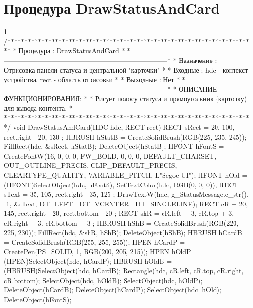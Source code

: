 \section{Процедура DrawStatusAndCard}
\footnotesize
\begin{listing}{1}
/*************************************************************************
* Процедура     : DrawStatusAndCard                                      *
*------------------------------------------------------------------------*
* Назначение    : Отрисовка панели статуса и центральной "карточки"      *
* Входные       : hdc - контекст устройства, rect - область отрисовки    *
* Выходные      : Нет                                                    *
*------------------------------------------------------------------------*
* ОПИСАНИЕ ФУНКЦИОНИРОВАНИЯ:                                             *
* Рисует полосу статуса и прямоугольник (карточку) для вывода контента.   *
*************************************************************************/
void DrawStatusAndCard(HDC hdc, RECT rect) {
    RECT sRect = { 20, 100, rect.right - 20, 130 }; 
    HBRUSH hStatB = CreateSolidBrush(RGB(225, 235, 245)); 
    FillRect(hdc, &sRect, hStatB); DeleteObject(hStatB);
    HFONT hFontS = CreateFontW(16, 0, 0, 0, FW_BOLD, 0, 0, 0, DEFAULT_CHARSET,
		 OUT_OUTLINE_PRECIS, CLIP_DEFAULT_PRECIS,
		 CLEARTYPE_QUALITY, VARIABLE_PITCH, L"Segoe UI");
    HFONT hOld = (HFONT)SelectObject(hdc, hFontS); 
    SetTextColor(hdc, RGB(0, 0, 0));
    RECT sText = { 35, 105, rect.right - 35, 125 }; 
    DrawTextW(hdc, g_StatusMessage.c_str(), -1, &sText, 
              DT_LEFT | DT_VCENTER | DT_SINGLELINE);
    RECT cR = { 20, 145, rect.right - 20, rect.bottom - 20 }; 
    RECT shR = { cR.left + 3, cR.top + 3, cR.right + 3, cR.bottom + 3 };
    HBRUSH hShB = CreateSolidBrush(RGB(220, 225, 230)); 
    FillRect(hdc, &shR, hShB); DeleteObject(hShB);
    HBRUSH hCardB = CreateSolidBrush(RGB(255, 255, 255)); 
    HPEN hCardP = CreatePen(PS_SOLID, 1, RGB(200, 205, 215));
    HPEN hOldP = (HPEN)SelectObject(hdc, hCardP); 
    HBRUSH hOldB = (HBRUSH)SelectObject(hdc, hCardB);
    Rectangle(hdc, cR.left, cR.top, cR.right, cR.bottom);
    SelectObject(hdc, hOldB); SelectObject(hdc, hOldP); 
    DeleteObject(hCardB); DeleteObject(hCardP); 
    SelectObject(hdc, hOld); DeleteObject(hFontS);
}
\end{listing}
\normalsize

\pagebreak

